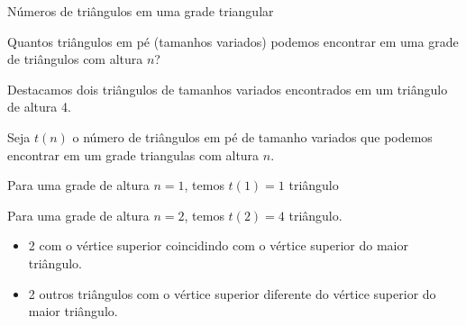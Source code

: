 \begin{exemplo}{Números de triângulos em uma grade triangular}


\begin{minipage}{\textwidth}

Quantos triângulos em pé (tamanhos variados)
  podemos encontrar em uma grade de triângulos com
  altura $n$?
  
\begin{center}
    \qquad
  \end{center}

Destacamos dois triângulos de tamanhos variados encontrados em um triângulo de altura 4.

\end{minipage}


Seja $t(n)$ o número de triângulos em pé de tamanho variados que podemos encontrar em um grade triangulas com altura $n$.

Para uma grade de altura $n = 1$, temos $t(1) = 1$ triângulo

\begin{center}
  \end{center}
  
Para uma grade de altura $n = 2$, temos $t(2) = 4$ triângulo.

\begin{itemize}
  \item 2 com o vértice superior coincidindo com o vértice superior do maior triângulo.
  \item 2 outros triângulos com o vértice superior diferente do vértice superior do maior triângulo.
\end{itemize}


\end{exemplo}
